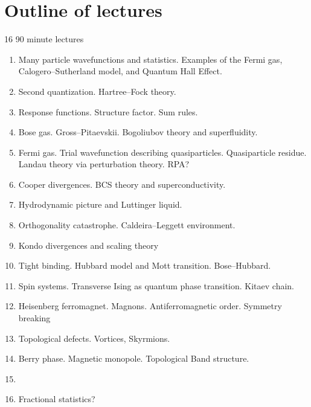 \section{Outline of lectures}

16 90 minute lectures

\begin{enumerate}
\item Many particle wavefunctions and statistics. Examples of the Fermi gas, Calogero--Sutherland model, and Quantum Hall Effect.

\item Second quantization. Hartree--Fock theory.

\item Response functions. Structure factor. Sum rules. 

\item Bose gas. Gross--Pitaevskii. Bogoliubov theory and superfluidity.

\item Fermi gas. Trial wavefunction describing quasiparticles. Quasiparticle residue. Landau theory via perturbation theory. RPA?

\item Cooper divergences. BCS theory and superconductivity. 

\item Hydrodynamic picture and Luttinger liquid.

\item Orthogonality catastrophe. Caldeira--Leggett environment.

\item Kondo divergences and scaling theory

\item Tight binding. Hubbard model and Mott transition. Bose--Hubbard.

\item Spin systems. Transverse Ising as quantum phase transition. Kitaev chain.

\item Heisenberg ferromagnet. Magnons. Antiferromagnetic order. Symmetry breaking

\item Topological defects. Vortices, Skyrmions. 

\item Berry phase. Magnetic monopole. Topological Band structure.

\item 

\item Fractional statistics?
\end{enumerate}